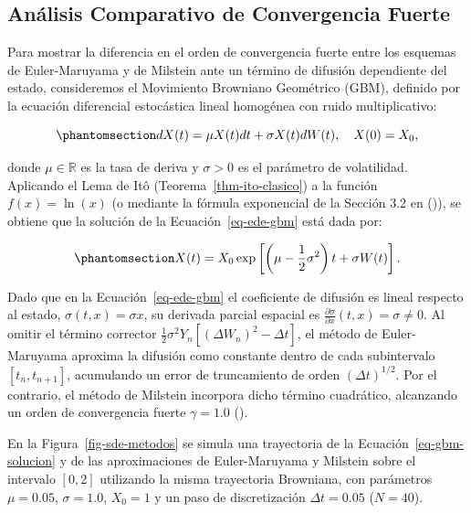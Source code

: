 \documentclass[
  spanish,
  letterpaper,
  DIV=11,
  numbers=noendperiod]{scrreprt}
\theoremstyle{plain}
\theoremstyle{plain}
\theoremstyle{plain}
\theoremstyle{definition}
\theoremstyle{remark}
\begin{document}
\subsection{Análisis Comparativo de Convergencia
Fuerte}\label{anuxe1lisis-comparativo-de-convergencia-fuerte}

Para mostrar la diferencia en el orden de convergencia fuerte entre los
esquemas de Euler-Maruyama y de Milstein ante un término de difusión
dependiente del estado, consideremos el Movimiento Browniano Geométrico
(GBM), definido por la ecuación diferencial estocástica lineal homogénea
con ruido multiplicativo:

\begin{equation}\phantomsection\label{eq-ede-gbm}{
dX(t) = \mu X(t) dt + \sigma X(t) dW(t), \quad X(0) = X_0,
}\end{equation}

donde \(\mu \in \mathbb{R}\) es la tasa de deriva y \(\sigma > 0\) es el
parámetro de volatilidad. Aplicando el Lema de Itô
(Teorema~\ref{thm-ito-clasico}) a la función \(f(x) = \ln(x)\) (o
mediante la fórmula exponencial de la Sección 3.2 en
()), se obtiene que la solución
de la Ecuación~\ref{eq-ede-gbm} está dada por:

\begin{equation}\phantomsection\label{eq-gbm-solucion}{
X(t) = X_0 \exp\left[ \left( \mu - \frac{1}{2}\sigma^2 \right)t + \sigma W(t) \right].
}\end{equation}

Dado que en la Ecuación~\ref{eq-ede-gbm} el coeficiente de difusión es
lineal respecto al estado, \(\sigma(t, x) = \sigma x\), su derivada
parcial espacial es
\(\displaystyle \frac{\partial \sigma}{\partial x}(t, x) = \sigma \neq 0\).
Al omitir el término corrector
\(\frac{1}{2}\sigma^2 Y_n [(\Delta W_n)^2 - \Delta t]\), el método de
Euler-Maruyama aproxima la difusión como constante dentro de cada
subintervalo \([t_n, t_{n+1}]\), acumulando un error de truncamiento de
orden \((\Delta t)^{1/2}\). Por el contrario, el método de Milstein
incorpora dicho término cuadrático, alcanzando un orden de convergencia
fuerte \(\gamma = 1.0\) ().

En la Figura~\ref{fig-sde-metodos} se simula una trayectoria de la
Ecuación~\ref{eq-gbm-solucion} y de las aproximaciones de Euler-Maruyama
y Milstein sobre el intervalo \([0, 2]\) utilizando la misma trayectoria
Browniana, con parámetros \(\mu = 0.05\), \(\sigma = 1.0\), \(X_0 = 1\)
y un paso de discretización \(\Delta t = 0.05\) (\(N = 40\)).
\end{document}
